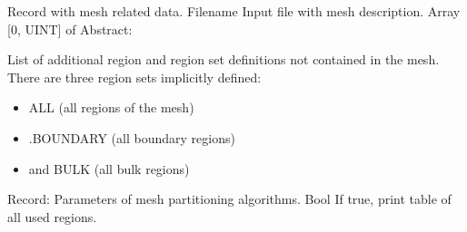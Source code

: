\begin{RecordType}
	{}
	{} %
	{} %
	{} %
	{{{Record with mesh related data.}}}
		\KeyItem
			{}
			{{Filename}}
			{\textrangle}
			{} %
			{{{Input file with mesh description.}}}
		\KeyItem
			{}
			{{Array [0, UINT] of }{Abstract}{: }}
			{\textrangle}
			{} %
			{{{{List of additional region and region set definitions not contained in the mesh.}\\{
There are three region sets implicitly defined:}
}
\begin{itemize}
\item {ALL (all regions of the mesh)}
\item {.BOUNDARY (all boundary regions)}
\item {and BULK (all bulk regions)}
\end{itemize}
}}
		\KeyItem
			{}
			{{Record}{: }}
			{\textrangle}
			{} %
			{{{Parameters of mesh partitioning algorithms.}}}
		\KeyItem
			{}
			{{Bool}}
			{\textrangle}
			{} %
			{{{If true, print table of all used regions.}}}
\end{RecordType}
